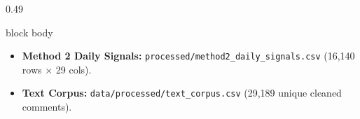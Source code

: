 \documentclass[aspectratio=169, 10pt]{beamer}
\newenvironment{card}[1][]{%
        \begin{beamercolorbox}[rounded=true,shadow=false,wd=\linewidth,sep=3.5pt,#1]{block body}%
        \fontsize{7.8pt}{9.8pt}\selectfont%
    }{%
        \end{beamercolorbox}%
    }
\begin{document}
\begin{frame}[t]
\begin{columns}[T]
\begin{column}{0.49\textwidth}
\begin{card}
\begin{itemize}
                        \item \textbf{Method 2 Daily Signals:} \texttt{processed/method2\_daily\_signals.csv} (16,140 rows $\times$ 29 cols).                                                          
                        \item \textbf{Text Corpus:} \texttt{data/processed/text\_corpus.csv} (29,189 unique cleaned comments).                                                                         
                    \end{itemize}                                                                                                                                                                      
                \end{card}                                                                                                                                                                             
            \end{column}                                                                                                                                                                               
        \end{columns}                                                                                                                                                                                  
    \end{frame}                                                                                                                                                                                        
                                                                                                                                                                                                       
\end{document}
